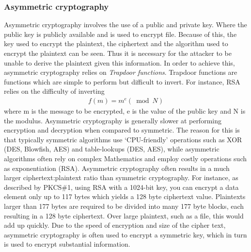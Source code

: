 \documentclass[12pt, titlepage]{article}
\begin{document}
\subsubsection*{Asymmetric cryptography}
Asymmetric cryptography involves the use of a public and private key. Where the public key is publicly available and is used to encrypt file. Because of this, the key used to encrypt the plaintext, the ciphertext and the algorithm used to encrypt the plaintext can be seen. Thus it is necessary for the attacker to be unable to derive the plaintext given this information. In order to achieve this, asymmetric cryptography relies on \textit{Trapdoor functions}. Trapdoor functions are functions which are simple to perform but difficult to invert. For instance, RSA relies on the difficulty of inverting
\begin{align*}
f(m) = m^e (\bmod N)
\end{align*}
where m is the message to be encrypted, e is the value of the public key and N is the modulus.
\newline \indent Asymmetric cryptography is generally slower at performing encryption and decryption when compared to symmetric. The reason for this is that typically symmetric algorithms use `CPU-friendly' operations such as XOR (DES, Blowfish, AES) and table-lookups (DES, AES), while asymmetric algorithms often rely on complex Mathematics and employ costly operations such as exponentiation (RSA).
\newline \indent Asymmetric cryptography often results in a much larger ciphertext:plaintext ratio than symmetric cryptography. For instance, as described by PKCS\#1, using RSA with a 1024-bit key, you can encrypt a data element only up to 117 bytes which yields a 128 byte ciphertext value.\cite{rsaCiphertext} Plaintexts larger than 177 bytes are required to be divided into many 177 byte blocks, each resulting in a 128 byte ciphertext. Over large plaintext, such as a file, this would add up quickly.
\newline \indent Due to the speed of encryption and size of the cipher text, asymmetric cryptography is often used to encrypt a symmetric key, which in turn is used to encrypt substantial information.
\end{document}
